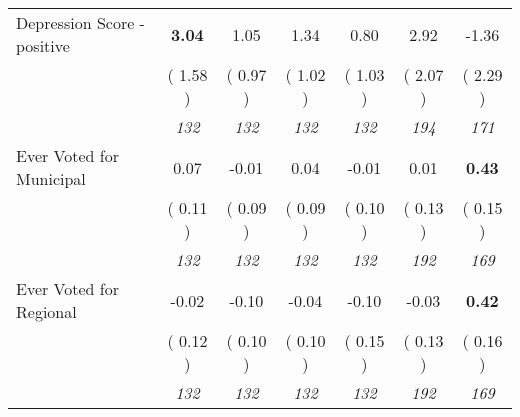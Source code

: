 \begin{tabular}{l c c c c c c}
Depression Score - positive & \textbf{      3.04 } &      1.05 &      1.34 &      0.80 &      2.92 &     -1.36 \\
& (     1.58 ) & (     0.97 ) & (     1.02 ) & (     1.03 ) & (     2.07 ) & (     2.29 ) \\
& \textit{ 132 } & \textit{ 132 } & \textit{ 132 } & \textit{ 132 } & \textit{ 194 } & \textit{ 171 } \\
Ever Voted for Municipal &      0.07 &     -0.01 &      0.04 &     -0.01 &      0.01 & \textbf{      0.43 } \\
& (     0.11 ) & (     0.09 ) & (     0.09 ) & (     0.10 ) & (     0.13 ) & (     0.15 ) \\
& \textit{ 132 } & \textit{ 132 } & \textit{ 132 } & \textit{ 132 } & \textit{ 192 } & \textit{ 169 } \\
Ever Voted for Regional &     -0.02 &     -0.10 &     -0.04 &     -0.10 &     -0.03 & \textbf{      0.42 } \\
& (     0.12 ) & (     0.10 ) & (     0.10 ) & (     0.15 ) & (     0.13 ) & (     0.16 ) \\
& \textit{ 132 } & \textit{ 132 } & \textit{ 132 } & \textit{ 132 } & \textit{ 192 } & \textit{ 169 } \\
\bottomrule
\end{tabular}
